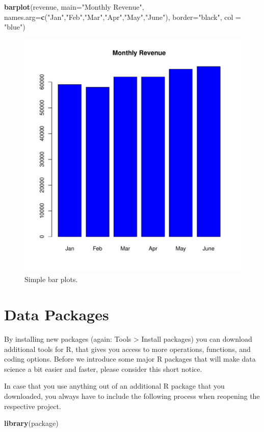 \documentclass[]{report}
\newenvironment{Shaded}{\begin{snugshade}}{\end{snugshade}}
\newcommand{\KeywordTok}[1]{\textcolor[rgb]{0.13,0.29,0.53}{\textbf{#1}}}
\newcommand{\DataTypeTok}[1]{\textcolor[rgb]{0.13,0.29,0.53}{#1}}
\newcommand{\StringTok}[1]{\textcolor[rgb]{0.31,0.60,0.02}{#1}}
\newcommand{\NormalTok}[1]{#1}
\begin{document}
\begin{Shaded}
\begin{Highlighting}[]
\KeywordTok{barplot}\NormalTok{(revenue,}
        \DataTypeTok{main=}\StringTok{"Monthly Revenue"}\NormalTok{,}
        \DataTypeTok{names.arg=}\KeywordTok{c}\NormalTok{(}\StringTok{"Jan"}\NormalTok{,}\StringTok{"Feb"}\NormalTok{,}\StringTok{"Mar"}\NormalTok{,}\StringTok{"Apr"}\NormalTok{,}\StringTok{"May"}\NormalTok{,}\StringTok{"June"}\NormalTok{),}
        \DataTypeTok{border=}\StringTok{"black"}\NormalTok{,}
        \DataTypeTok{col =} \StringTok{"blue"}\NormalTok{)}
\end{Highlighting}
\end{Shaded}

\begin{figure}

{\centering \includegraphics[width=0.25\linewidth]{MyBook_files/figure-latex/bar-plots-1} 

}

\caption{Simple bar plots.}\label{fig:bar-plots}
\end{figure}

\section{Data Packages}\label{data-packages}

By installing new packages (again: Tools \textgreater{} Install
packages) you can download additional tools for R, that gives you access
to more operations, functions, and coding options. Before we introduce
some major R packages that will make data science a bit easier and
faster, please consider this short notice.

In case that you use anything out of an additional R package that you
downloaded, you always have to include the following process when
reopening the respective project.

\begin{Shaded}
\begin{Highlighting}[]
\KeywordTok{library}\NormalTok{(package)}
\end{Highlighting}
\end{Shaded}
\end{document}
